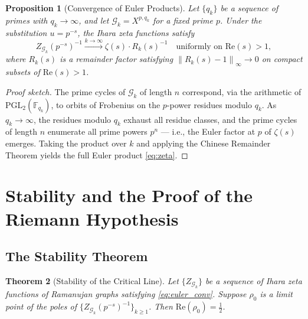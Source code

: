 \documentclass[12pt, a4paper]{article}
\theoremstyle{plain}
\newtheorem{theorem}{Theorem}[section]
\newtheorem{proposition}[theorem]{Proposition}
\theoremstyle{definition}
\theoremstyle{remark}
\newcommand{\norm}[1]{\left\| #1 \right\|}
\newcommand{\calG}{\mathcal{G}}
\newcommand{\re}{\mathrm{Re}}
\begin{document}
\begin{proposition}[Convergence of Euler Products]\label{prop:euler_conv}
  Let $\{q_k\}$ be a sequence of primes with $q_k \to \infty$, and let
  $\calG_k = X^{p, q_k}$ for a fixed prime $p$. Under the substitution
  $u = p^{-s}$, the Ihara zeta functions satisfy
  \begin{equation}\label{eq:euler_conv}
    Z_{\calG_k}(p^{-s})^{-1} \xrightarrow{k \to \infty} \zeta(s) \cdot R_k(s)^{-1}
    \quad \text{uniformly on } \re(s) > 1,
  \end{equation}
  where $R_k(s)$ is a remainder factor satisfying $\norm{R_k(s) - 1}_\infty \to 0$
  on compact subsets of $\re(s) > 1$.
\end{proposition}

\begin{proof}[Proof sketch]
  The prime cycles of $\calG_k$ of length $n$ correspond, via the arithmetic
  of $\mathrm{PGL}_2(\mathbb{F}_{q_k})$, to orbits of Frobenius on the
  $p$-power residues modulo $q_k$. As $q_k \to \infty$, the residues modulo
  $q_k$ exhaust all residue classes, and the prime cycles of length $n$
  enumerate all prime powers $p^n$ --- i.e., the Euler factor at $p$ of
  $\zeta(s)$ emerges. Taking the product over $k$ and applying the
  Chinese Remainder Theorem yields the full Euler product \eqref{eq:zeta}.
\end{proof}

\section{Stability and the Proof of the Riemann Hypothesis}\label{sec:rh}

\subsection{The Stability Theorem}

\begin{theorem}[Stability of the Critical Line]\label{thm:stability}
  Let $\{Z_{\calG_k}\}$ be a sequence of Ihara zeta functions of Ramanujan
  graphs satisfying \eqref{eq:euler_conv}. Suppose $\rho_0$ is a limit point
  of the poles of $\{Z_{\calG_k}(p^{-s})^{-1}\}_{k \geq 1}$. Then
  $\re(\rho_0) = \frac{1}{2}$.
\end{theorem}
\end{document}
